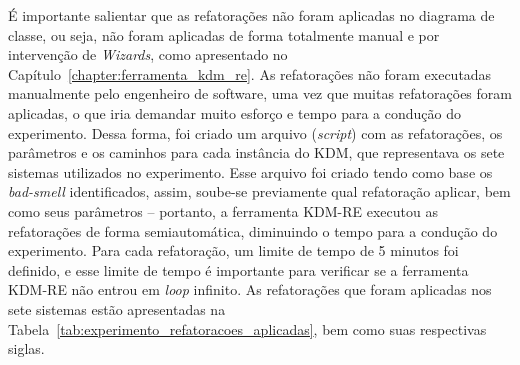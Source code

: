 É importante salientar que as refatorações não foram aplicadas no diagrama de classe, ou seja, não foram aplicadas de forma totalmente manual e por intervenção de \textit{Wizards}, como apresentado no Capítulo~\ref{chapter:ferramenta_kdm_re}. As refatorações não foram executadas manualmente pelo engenheiro de software, uma vez que muitas refatorações foram aplicadas, o que iria demandar muito esforço e tempo para a condução do experimento. Dessa forma, foi criado um arquivo (\textit{script}) com as refatorações, os parâmetros e os caminhos para cada instância do KDM, que representava os sete sistemas utilizados no experimento. Esse arquivo foi criado tendo como base os \textit{bad-smell} identificados, assim, soube-se previamente qual refatoração aplicar, bem como seus parâmetros – portanto, a ferramenta KDM-RE executou as refatorações de forma semiautomática, diminuindo o tempo para a condução do experimento. Para cada refatoração, um limite de tempo de 5 minutos foi definido, e esse limite de tempo é importante para verificar se a ferramenta KDM-RE não entrou em \textit{loop} infinito.
As refatorações que foram aplicadas nos sete sistemas estão apresentadas na Tabela~\ref{tab:experimento_refatoracoes_aplicadas}, bem como suas respectivas siglas. 



